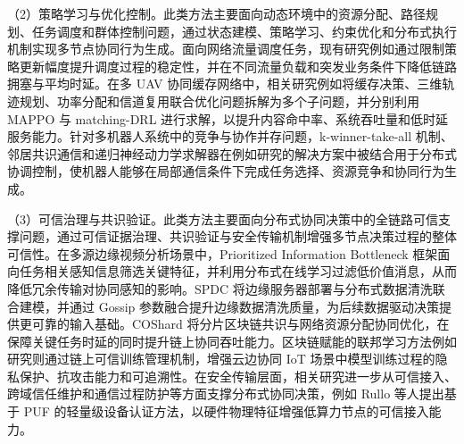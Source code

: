 （2）策略学习与优化控制。此类方法主要面向动态环境中的资源分配、路径规划、任务调度和群体控制问题，通过状态建模、策略学习、约束优化和分布式执行机制实现多节点协同行为生成。面向网络流量调度任务，现有研究例如\cite{ren2025distributed}通过限制策略更新幅度提升调度过程的稳定性，并在不同流量负载和突发业务条件下降低链路拥塞与平均时延。在多 UAV 协同缓存网络中，相关研究例如\cite{10412167}将缓存决策、三维轨迹规划、功率分配和信道复用联合优化问题拆解为多个子问题，并分别利用 MAPPO 与 matching-DRL 进行求解，以提升内容命中率、系统吞吐量和低时延服务能力。针对多机器人系统中的竞争与协作并存问题，k-winner-take-all 机制、邻居共识通信和递归神经动力学求解器在例如研究\cite{10521834}的解决方案中被结合用于分布式协调控制，使机器人能够在局部通信条件下完成任务选择、资源竞争和协同行为生成。

（3）可信治理与共识验证。此类方法主要面向分布式协同决策中的全链路可信支撑问题，通过可信证据治理、共识验证与安全传输机制增强多节点决策过程的整体可信性。在多源边缘视频分析场景中，Prioritized Information Bottleneck 框架\cite{10845862}面向任务相关感知信息筛选关键特征，并利用分布式在线学习过滤低价值消息，从而降低冗余传输对协同感知的影响。SPDC\cite{10930695} 将边缘服务器部署与分布式数据清洗联合建模，并通过 Gossip 参数融合提升边缘数据清洗质量，为后续数据驱动决策提供更可靠的输入基础。COShard\cite{11197552} 将分片区块链共识与网络资源分配协同优化，在保障关键任务时延的同时提升链上协同吞吐能力。区块链赋能的联邦学习方法例如研究\cite{10849591}则通过链上可信训练管理机制，增强云边协同 IoT 场景中模型训练过程的隐私保护、抗攻击能力和可追溯性。在安全传输层面，相关研究进一步从可信接入、跨域信任维护和通信过程防护等方面支撑分布式协同决策，例如 Rullo 等人\cite{DBLP:journals/tdsc/RulloFVRDCLS25}提出基于 PUF 的轻量级设备认证方法，以硬件物理特征增强低算力节点的可信接入能力。





